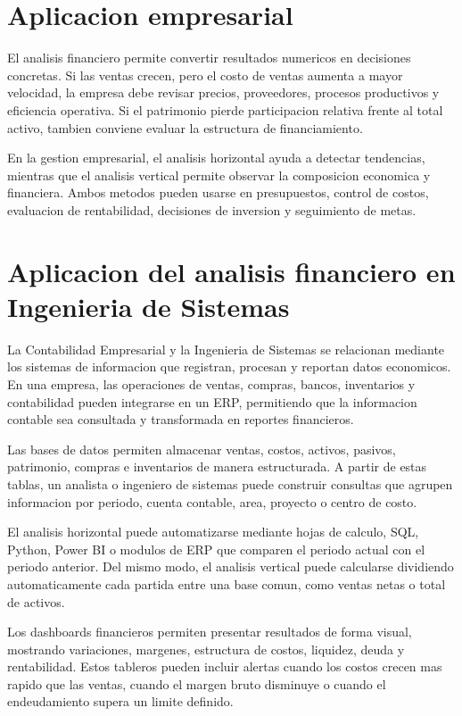 \section{Aplicacion empresarial}

El analisis financiero permite convertir resultados numericos en decisiones concretas. Si las ventas crecen, pero el costo de ventas aumenta a mayor velocidad, la empresa debe revisar precios, proveedores, procesos productivos y eficiencia operativa. Si el patrimonio pierde participacion relativa frente al total activo, tambien conviene evaluar la estructura de financiamiento.

En la gestion empresarial, el analisis horizontal ayuda a detectar tendencias, mientras que el analisis vertical permite observar la composicion economica y financiera. Ambos metodos pueden usarse en presupuestos, control de costos, evaluacion de rentabilidad, decisiones de inversion y seguimiento de metas.

\section{Aplicacion del analisis financiero en Ingenieria de Sistemas}

La Contabilidad Empresarial y la Ingenieria de Sistemas se relacionan mediante los sistemas de informacion que registran, procesan y reportan datos economicos. En una empresa, las operaciones de ventas, compras, bancos, inventarios y contabilidad pueden integrarse en un ERP, permitiendo que la informacion contable sea consultada y transformada en reportes financieros.

Las bases de datos permiten almacenar ventas, costos, activos, pasivos, patrimonio, compras e inventarios de manera estructurada. A partir de estas tablas, un analista o ingeniero de sistemas puede construir consultas que agrupen informacion por periodo, cuenta contable, area, proyecto o centro de costo.

El analisis horizontal puede automatizarse mediante hojas de calculo, SQL, Python, Power BI o modulos de ERP que comparen el periodo actual con el periodo anterior. Del mismo modo, el analisis vertical puede calcularse dividiendo automaticamente cada partida entre una base comun, como ventas netas o total de activos.

Los dashboards financieros permiten presentar resultados de forma visual, mostrando variaciones, margenes, estructura de costos, liquidez, deuda y rentabilidad. Estos tableros pueden incluir alertas cuando los costos crecen mas rapido que las ventas, cuando el margen bruto disminuye o cuando el endeudamiento supera un limite definido.

